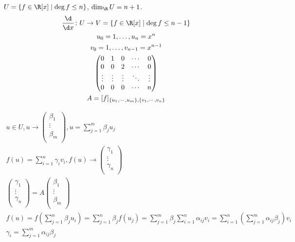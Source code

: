 \begin{exmp}
	$U = \{f \in \R[x] \mid \deg f \le n\}$, $\dim_{\R}U = n + 1$.
	\begin{gather*}
		\frac{\d}{\d x}\colon U \to V = \{f \in \R[x] \mid \deg f \le n - 1\} \\
		u_0 = 1, \dots, u_n = x^n \\
		v_0 = 1, \dots, v_{n - 1} = x^{n - 1} \\
		\begin{pmatrix}
			0 & 1 & 0 & \cdots & 0 \\
			0 & 0 & 2 & \cdots & 0 \\
			\vdots&\vdots&\vdots&\ddots&\vdots \\
			0 & 0 & 0 & \cdots & n \\
		\end{pmatrix} \\
		A = [f]_{\{u_1, \cdots, u_m\}, \{v_1, \cdots, v_n\}}
	\end{gather*}
\end{exmp}

\begin{Rem}
	\begin{gather*}
		u \in U, u \to \begin{pmatrix}
			\beta_1 \\
			\vdots \\
			\beta_m \\
		\end{pmatrix}, u = \sum_{j = 1}^m\beta_ju_j \\
		f(u) = \sum_{i = 1}^n\gamma_iv_i, f(u) \to \begin{pmatrix}
			\gamma_1 \\
			\vdots \\
			\gamma_n \\
		\end{pmatrix} \\
		\begin{pmatrix}
			\gamma_1 \\
			\vdots \\
			\gamma_n \\
		\end{pmatrix}
		= A
		\begin{pmatrix}
			\beta_1 \\
			\vdots \\
			\beta_m \\
		\end{pmatrix} \\
		f(u) = f\left(\sum_{j = 1}^n\beta_ju_i\right) = \sum_{j = 1}^n\beta_jf(u_j)
		= \sum_{j = 1}^m\beta_j \sum_{i = 1}^n\alpha_{ij}v_i = \sum_{i = 1}^n\left(\sum_{j = 1}^m\alpha_{ij}\beta_j\right) v_i \\
		\gamma_i = \sum_{j = 1}^m\alpha_{ij}\beta_j \\
	\end{gather*}
\end{Rem}

